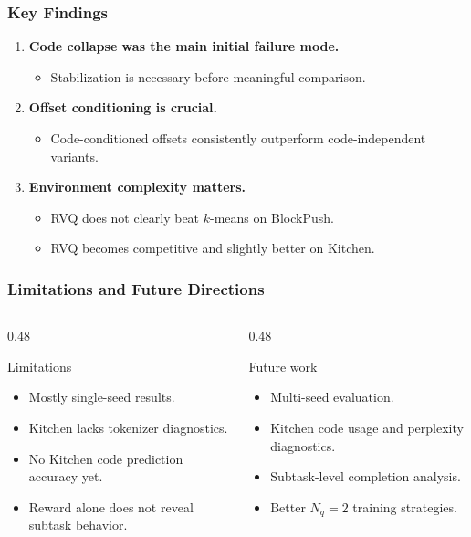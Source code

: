 \documentclass[aspectratio=169]{ctexbeamer}
\begin{document}
\begin{frame}
  \frametitle{Key Findings}
  \begin{enumerate}
    \item \textbf{Code collapse was the main initial failure mode.}
    \begin{itemize}
      \item Stabilization is necessary before meaningful comparison.
    \end{itemize}
    \item \textbf{Offset conditioning is crucial.}
    \begin{itemize}
      \item Code-conditioned offsets consistently outperform code-independent variants.
    \end{itemize}
    \item \textbf{Environment complexity matters.}
    \begin{itemize}
      \item RVQ does not clearly beat $k$-means on BlockPush.
      \item RVQ becomes competitive and slightly better on Kitchen.
    \end{itemize}
  \end{enumerate}
\end{frame}

\begin{frame}
  \frametitle{Limitations and Future Directions}
  \begin{columns}[T]
    \begin{column}{0.48\textwidth}
      \begin{alertblock}{Limitations}
        \begin{itemize}
          \item Mostly single-seed results.
          \item Kitchen lacks tokenizer diagnostics.
          \item No Kitchen code prediction accuracy yet.
          \item Reward alone does not reveal subtask behavior.
        \end{itemize}
      \end{alertblock}
    \end{column}
    \begin{column}{0.48\textwidth}
      \begin{block}{Future work}
        \begin{itemize}
          \item Multi-seed evaluation.
          \item Kitchen code usage and perplexity diagnostics.
          \item Subtask-level completion analysis.
          \item Better $N_q=2$ training strategies.
        \end{itemize}
      \end{block}
    \end{column}
  \end{columns}
\end{frame}
\end{document}

